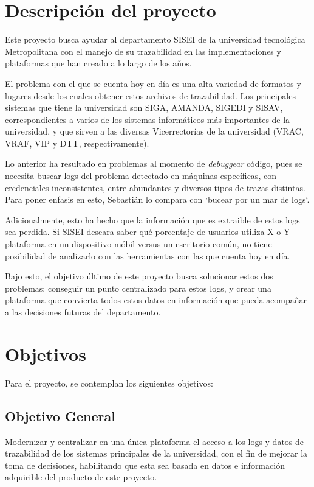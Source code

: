 \section{Descripción del proyecto}

Este proyecto busca ayudar al departamento SISEI de la universidad tecnológica Metropolitana con el manejo de su trazabilidad en las implementaciones y plataformas que han creado a lo largo de los años.

El problema con el que se cuenta hoy en día es una alta variedad de formatos y lugares desde los cuales obtener estos archivos de trazabilidad. Los principales sistemas que tiene la universidad son SIGA, AMANDA, SIGEDI y SISAV, correspondientes a varios de los sistemas informáticos más importantes de la universidad, y que sirven a las diversas Vicerrectorías de la universidad (VRAC, VRAF, VIP y DTT, respectivamente).

Lo anterior ha resultado en problemas al momento de \textit{debuggear} código, pues se necesita buscar logs del problema detectado en máquinas específicas, con credenciales inconsistentes, entre abundantes y diversos tipos de trazas distintas. Para poner enfasis en esto, Sebastián lo compara con `bucear por un mar de logs`.

Adicionalmente, esto ha hecho que la información que es extraible de estos logs sea perdida. Si SISEI deseara saber qué porcentaje de usuarios utiliza X o Y plataforma en un dispositivo móbil versus un escritorio común, no tiene posibilidad de analizarlo con las herramientas con las que cuenta hoy en día.

Bajo esto, el objetivo último de este proyecto busca solucionar estos dos problemas; conseguir un punto centralizado para estos logs, y crear una plataforma que convierta todos estos datos en información que pueda acompañar a las decisiones futuras del departamento.

\section{Objetivos}

Para el proyecto, se contemplan los siguientes objetivos:

\subsection{Objetivo General}

Modernizar y centralizar en una única plataforma el acceso a los logs y datos de trazabilidad de los sistemas principales de la universidad, con el fin de mejorar la toma de decisiones, habilitando que esta sea basada en datos e información adquirible del producto de este proyecto.

